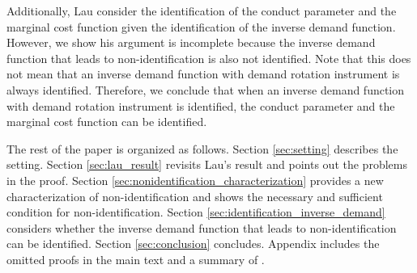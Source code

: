 \documentclass[11pt, a4paper]{article}
\theoremstyle{remark}
\begin{document}
Additionally, Lau consider the identification of the conduct parameter and the marginal cost function given the identification of the inverse demand function.
However, we show his argument is incomplete because the inverse demand function that leads to non-identification is also not identified.
Note that this does not mean that an inverse demand function with demand rotation instrument is always identified.
Therefore, we conclude that when an inverse demand function with demand rotation instrument is identified, the conduct parameter and the marginal cost function can be identified.


The rest of the paper is organized as follows.
Section \ref{sec:setting} describes the setting.
Section \ref{sec:lau_result} revisits Lau's result and points out the problems in the proof.
Section \ref{sec:nonidentification_characterization} provides a new characterization of non-identification and shows the necessary and sufficient condition for non-identification.
Section \ref{sec:identification_inverse_demand} considers whether the inverse demand function that leads to non-identification can be identified.
Section \ref{sec:conclusion} concludes.
Appendix includes the omitted proofs in the main text and a summary of \citet{goldmanNote1964}.






\end{document}
